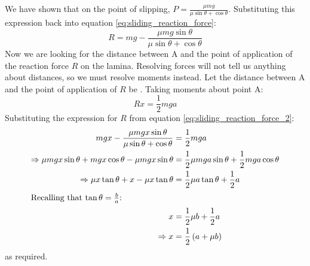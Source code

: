 \begin{problem}
{\nl
We have shown that on the point of slipping, $P = \frac{\mu mg}{\mu\sin{\theta} + \cos{\theta}}$. Substituting this expression back into equation \ref{eq:sliding_reaction_force}:
\begin{equation}
R = mg - \frac{\mu mg\sin{\theta}}{\mu\sin{\theta}+\cos{\theta}} \label{eq:sliding_reaction_force_2}
\end{equation}
Now we are looking for the distance between A and the point of application of the reaction force $R$ on the lamina. Resolving forces will not tell us anything about distances, so we must resolve moments instead. Let the distance between A and the point of application of $R$ be . Taking moments about point A:
\begin{equation*}
Rx = \frac{1}{2}mga
\end{equation*} 
Substituting the expression for $R$ from equation \ref{eq:sliding_reaction_force_2}:
\begin{align*}
mgx - \frac{\mu mgx\sin{\theta}}{\mu\sin{\theta}+\cos{\theta}}&= \frac{1}{2}mga \\
\Rightarrow \mu mgx\sin{\theta} + mgx\cos{\theta} - \mu mgx\sin{\theta}&= \frac{1}{2}\mu mga\sin{\theta} + \frac{1}{2}mga\cos{\theta} \\
\Rightarrow \mu x\tan{\theta} + x - \mu x\tan{\theta}&= \frac{1}{2}\mu a\tan{\theta} + \frac{1}{2}a \\
\intertext{Recalling that $\tan{\theta} = \frac{b}{a}$:}
x&= \frac{1}{2}\mu b + \frac{1}{2} a \\
\Rightarrow x&=  \frac{1}{2}\left(a + \mu b\right)
\end{align*}
as required.
}
\end{problem}